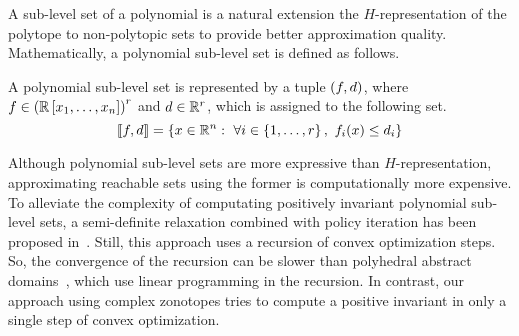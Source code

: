 A sub-level set of a polynomial is a natural extension the
$H$-representation of the polytope to non-polytopic sets to provide
better approximation quality.  Mathematically, a polynomial sub-level
set is defined as follows.
%
\begin{definition}
A polynomial sub-level set is represented by a tuple $\left(f,d\right)$,
where 
$f\in\left(\mathbb{R}\left[x_1,\ldots,x_n\right]\right)^r$ and $d\in\mathbb{R}^r$,
which is assigned to the following set.
%
\[
\left\llbracket f,d\right\rrbracket=\left\{x\in\mathbb{R}^n:~\forall
  i\in\left\{1,\ldots,r\right\},~f_i(x)\leq d_i\right\}
\]
%
\end{definition}
%
Although polynomial sub-level sets are more expressive than
$H$-representation, approximating reachable sets using the former is
computationally more expensive.  To alleviate the complexity of
computating positively invariant polynomial sub-level sets, a
semi-definite relaxation combined with policy iteration has been
proposed in~\cite{todo}.  Still, this approach uses a recursion of
convex optimization steps.  So, the convergence of the recursion can
be slower than polyhedral abstract domains~\cite{todo}, which use
linear programming in the recursion.  In contrast, our approach using
complex zonotopes tries to compute a positive invariant in only a
single step of convex optimization.

